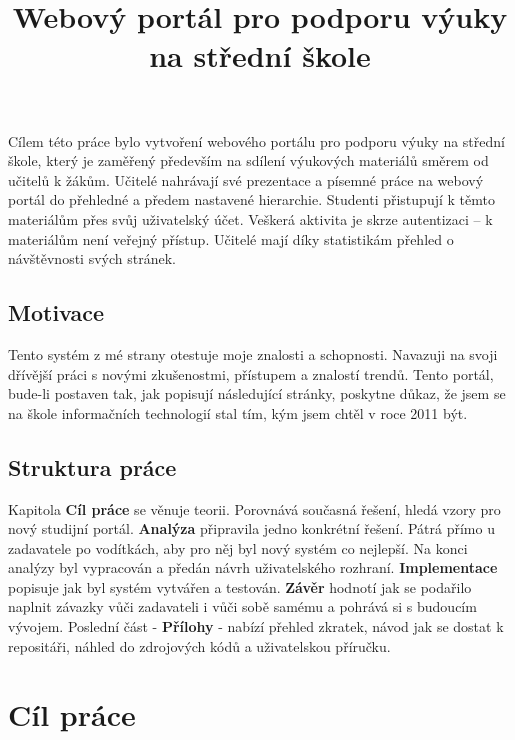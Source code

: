 \documentclass[thesis=B,czech]{FITthesis}[2012/06/26]
\title{Webový portál pro podporu výuky na střední škole}
\begin{document}


\begin{introduction}
Cílem této práce bylo vytvoření webového portálu pro podporu výuky na střední škole, který je zaměřený především na sdílení výukových materiálů směrem od učitelů k žákům. Učitelé nahrávají své prezentace a písemné práce na webový portál do přehledné a předem nastavené hierarchie. Studenti přistupují k těmto materiálům přes svůj uživatelský účet. Veškerá aktivita je skrze autentizaci – k materiálům není veřejný přístup. Učitelé mají díky statistikám přehled o návštěvnosti svých stránek.

\section{Motivace} 
Tento systém z mé strany otestuje moje znalosti a schopnosti. Navazuji na svoji dřívější práci s novými zkušenostmi, přístupem a znalostí trendů. Tento portál, bude-li postaven tak, jak popisují následující stránky, poskytne důkaz, že jsem se na škole informačních technologií stal tím, kým jsem chtěl v roce 2011 být.

\section{Struktura práce}
Kapitola \textbf{Cíl práce} se věnuje teorii. Porovnává současná řešení, hledá vzory pro nový studijní portál. \textbf{Analýza} připravila jedno konkrétní řešení. Pátrá přímo u zadavatele po vodítkách, aby pro něj byl nový systém co nejlepší. Na konci analýzy byl vypracován a předán návrh uživatelského rozhraní. \textbf{Implementace} popisuje jak byl systém vytvářen a testován. \textbf{Závěr} hodnotí jak se podařilo naplnit závazky vůči zadavateli i vůči sobě samému a pohrává si s budoucím vývojem. Poslední část - \textbf{Přílohy} - nabízí přehled zkratek, návod jak se dostat k repositáři, náhled do zdrojových kódů a uživatelskou příručku.

\end{introduction}

\chapter{Cíl práce}
\end{document}
